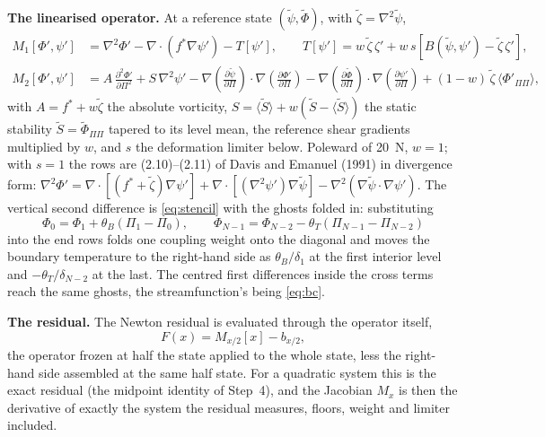 \documentclass[11pt,a4paper]{article}
\newcommand{\dd}[2]{\frac{\partial #1}{\partial #2}}
\newcommand{\ddd}[2]{\frac{\partial^2 #1}{\partial #2^2}}
\newcommand{\lap}{\nabla^2}
\newcommand{\grad}{\nabla}
\begin{document}
\textbf{The linearised operator.} At a reference state
$(\tilde\psi,\tilde\Phi)$, with $\tilde\zeta=\lap\tilde\psi$,
\begin{align}
M_1[\Phi',\psi'] &= \lap\Phi' - \grad\cdot\left(f^{*}\grad\psi'\right) - T[\psi'],
\qquad
T[\psi'] = w\,\tilde\zeta\,\zeta' + w\,s\left[B(\tilde\psi,\psi') - \tilde\zeta\,\zeta'\right],
\label{eq:M1}\\[1mm]
M_2[\Phi',\psi'] &= A\,\ddd{\Phi'}{\Pi} + S\,\lap\psi'
 - \grad\!\left(\dd{\tilde\psi}{\Pi}\right)\cdot\grad\!\left(\dd{\Phi'}{\Pi}\right)
 - \grad\!\left(\dd{\tilde\Phi}{\Pi}\right)\cdot\grad\!\left(\dd{\psi'}{\Pi}\right)
 + (1-w)\,\tilde\zeta\,\big\langle\Phi'_{\Pi\Pi}\big\rangle ,
\label{eq:M2}
\end{align}
with $A=f^{*}+w\tilde\zeta$ the absolute vorticity, $S=\langle\tilde S\rangle +
w(\tilde S-\langle\tilde S\rangle)$ the static stability $\tilde S=\tilde\Phi_{\Pi\Pi}$
tapered to its level mean, the reference shear gradients multiplied by $w$, and
$s$ the deformation limiter below. Poleward of 20~N, $w=1$; with $s=1$ the
rows are (2.10)--(2.11) of Davis and Emanuel (1991) in divergence form:
$\lap\Phi'=\grad\cdot[(f^{*}+\tilde\zeta)\grad\psi']+\grad\cdot[(\lap\psi')\grad\tilde\psi]
-\lap(\grad\tilde\psi\cdot\grad\psi')$. The vertical second difference is
\eqref{eq:stencil} with the ghosts folded in: substituting
\begin{equation}
\Phi_0 = \Phi_1 + \theta_B(\Pi_1-\Pi_0),
\qquad
\Phi_{N-1} = \Phi_{N-2} - \theta_T(\Pi_{N-1}-\Pi_{N-2})
\label{eq:ghosts}
\end{equation}
into the end rows folds one coupling weight onto the diagonal and moves the
boundary temperature to the right-hand side as $\theta_B/\delta_1$ at the first
interior level and $-\theta_T/\delta_{N-2}$ at the last. The centred first
differences inside the cross terms reach the same ghosts, the streamfunction's
being \eqref{eq:bc}.

\textbf{The residual.} The Newton residual is evaluated through the operator
itself,
\begin{equation}
F(x) = M_{x/2}[x] - b_{x/2},
\label{eq:Fmid}
\end{equation}
the operator frozen at half the state applied to the whole state, less the
right-hand side assembled at the same half state. For a quadratic system this
is the exact residual (the midpoint identity of Step~4), and the Jacobian
$M_x$ is then the derivative of exactly the system the residual measures,
floors, weight and limiter included.
\end{document}

